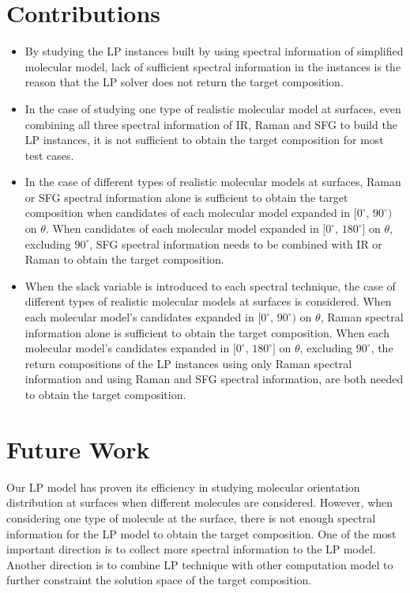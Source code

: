 \section{Contributions}
\begin{itemize}
  \item By studying the LP instances built by using spectral information of simplified molecular model, lack of sufficient spectral information in the instances is the reason that the LP solver does not return the target composition.
  \item In the case of studying one type of realistic molecular model at surfaces, even combining all three spectral information of IR, Raman and SFG to build the LP instances, it is not sufficient to obtain the target composition for most test cases. 
  \item In the case of different types of realistic molecular models at surfaces, Raman or SFG spectral information alone is sufficient to obtain the target composition when candidates of each molecular model expanded in $[0^{\circ}$, $90^{\circ})$ on $\theta$. When candidates of each molecular model expanded in $[0^{\circ}$, $180^{\circ}]$ on $\theta$, excluding $90^{\circ}$, SFG spectral information needs to be combined with IR or Raman to obtain the target composition.
  \item When the slack variable is introduced to each spectral technique, the case of different types of realistic molecular models at surfaces is considered. When each molecular model's candidates expanded in $[0^{\circ}$, $90^{\circ})$ on $\theta$, Raman spectral information alone is sufficient to obtain the target composition. When each molecular model's candidates expanded in $[0^{\circ}$, $180^{\circ}]$ on $\theta$, excluding $90^{\circ}$, the return compositions of the LP instances using only Raman spectral information and using Raman and SFG spectral information, are both needed to obtain the target composition.
\end{itemize}

\section{Future Work}
Our LP model has proven its efficiency in studying molecular orientation distribution at surfaces when different molecules are considered. However, when considering one type of molecule at the surface, there is not enough spectral information for the LP model to obtain the target composition. One of the most important direction is to collect more spectral information to the LP model. Another direction is to combine LP technique with other computation model to further constraint the solution space of the target composition.








